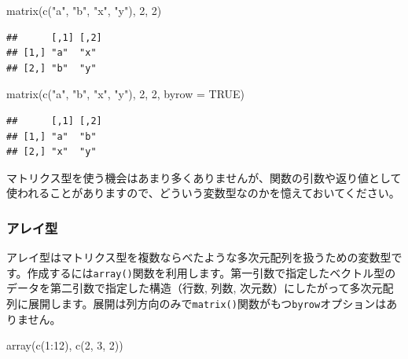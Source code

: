 \documentclass[
  12pt,
]{book}
\newenvironment{Shaded}{\begin{snugshade}}{\end{snugshade}}
\newcommand{\AttributeTok}[1]{\textcolor[rgb]{0.77,0.63,0.00}{#1}}
\newcommand{\ConstantTok}[1]{\textcolor[rgb]{0.00,0.00,0.00}{#1}}
\newcommand{\DecValTok}[1]{\textcolor[rgb]{0.00,0.00,0.81}{#1}}
\newcommand{\FunctionTok}[1]{\textcolor[rgb]{0.00,0.00,0.00}{#1}}
\newcommand{\NormalTok}[1]{#1}
\newcommand{\SpecialCharTok}[1]{\textcolor[rgb]{0.00,0.00,0.00}{#1}}
\newcommand{\StringTok}[1]{\textcolor[rgb]{0.31,0.60,0.02}{#1}}
\begin{document}
\begin{Shaded}
\begin{Highlighting}[]
\FunctionTok{matrix}\NormalTok{(}\FunctionTok{c}\NormalTok{(}\StringTok{"a"}\NormalTok{, }\StringTok{"b"}\NormalTok{, }\StringTok{"x"}\NormalTok{, }\StringTok{"y"}\NormalTok{), }\DecValTok{2}\NormalTok{, }\DecValTok{2}\NormalTok{)}
\end{Highlighting}
\end{Shaded}

\begin{verbatim}
##      [,1] [,2]
## [1,] "a"  "x" 
## [2,] "b"  "y"
\end{verbatim}

\begin{Shaded}
\begin{Highlighting}[]
\FunctionTok{matrix}\NormalTok{(}\FunctionTok{c}\NormalTok{(}\StringTok{"a"}\NormalTok{, }\StringTok{"b"}\NormalTok{, }\StringTok{"x"}\NormalTok{, }\StringTok{"y"}\NormalTok{), }\DecValTok{2}\NormalTok{, }\DecValTok{2}\NormalTok{, }\AttributeTok{byrow =} \ConstantTok{TRUE}\NormalTok{)}
\end{Highlighting}
\end{Shaded}

\begin{verbatim}
##      [,1] [,2]
## [1,] "a"  "b" 
## [2,] "x"  "y"
\end{verbatim}

マトリクス型を使う機会はあまり多くありませんが、関数の引数や返り値として使われることがありますので、どういう変数型なのかを憶えておいてください。

\hypertarget{ux30a2ux30ecux30a4ux578b}{%
\subsubsection{アレイ型}\label{ux30a2ux30ecux30a4ux578b}}

アレイ型はマトリクス型を複数ならべたような多次元配列を扱うための変数型です。作成するには\texttt{array()}関数を利用します。第一引数で指定したベクトル型のデータを第二引数で指定した構造（行数, 列数, 次元数）にしたがって多次元配列に展開します。展開は列方向のみで\texttt{matrix()}関数がもつ\texttt{byrow}オプションはありません。

\begin{Shaded}
\begin{Highlighting}[]
\FunctionTok{array}\NormalTok{(}\FunctionTok{c}\NormalTok{(}\DecValTok{1}\SpecialCharTok{:}\DecValTok{12}\NormalTok{), }\FunctionTok{c}\NormalTok{(}\DecValTok{2}\NormalTok{, }\DecValTok{3}\NormalTok{, }\DecValTok{2}\NormalTok{))}
\end{Highlighting}
\end{Shaded}
\end{document}
